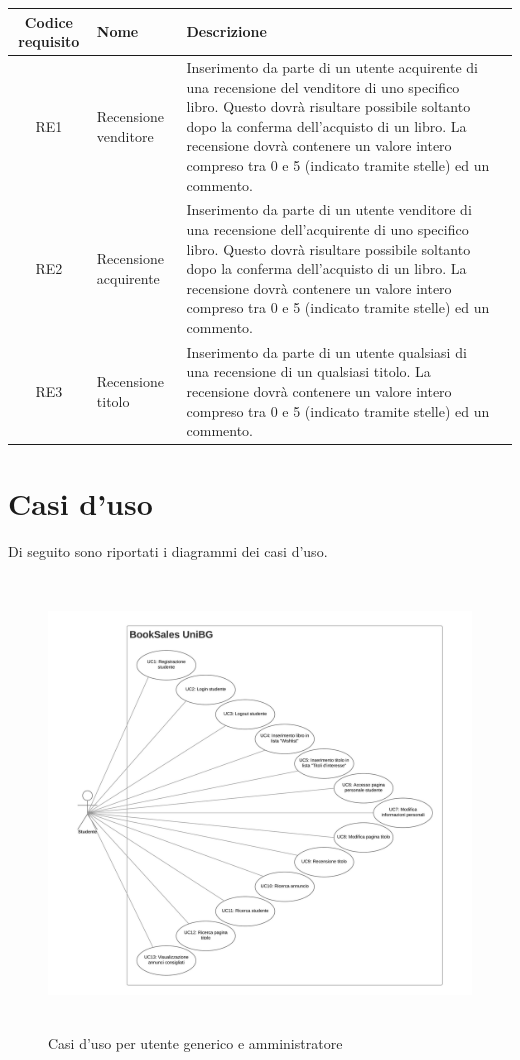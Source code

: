 \documentclass[10pt,a4paper]{report}
\begin{document}
	\begin{tabular}{cp{3cm}p{9cm}p{1cm}}
		Codice requisito&Nome&Descrizione\\ \hline
		RE1&Recensione venditore&Inserimento da parte di un utente acquirente di una recensione del venditore di uno specifico libro. Questo dovrà risultare possibile soltanto dopo la conferma dell'acquisto di un libro. La recensione dovrà contenere un valore intero compreso tra 0 e 5 (indicato tramite stelle) ed un commento.\\ \hline
		RE2&Recensione acquirente&Inserimento da parte di un utente venditore di una recensione dell'acquirente di uno specifico libro. Questo dovrà risultare possibile soltanto dopo la conferma dell'acquisto di un libro. La recensione dovrà contenere un valore intero compreso tra 0 e 5 (indicato tramite stelle) ed un commento.\\ \hline
		RE3&Recensione titolo&Inserimento da parte di un utente qualsiasi di una recensione di un qualsiasi titolo. La recensione dovrà contenere un valore intero compreso tra 0 e 5 (indicato tramite stelle) ed un commento.\\ \hline
	\end{tabular}
	
	\section{Casi d'uso}
	Di seguito sono riportati i diagrammi dei casi d'uso.
	
	\begin{figure}[H]
		\centering
		\includegraphics[height=12cm, width=17cm, keepaspectratio]{g_uc}
		\caption{Casi d'uso per utente generico e amministratore}
	\end{figure}
\end{document}
